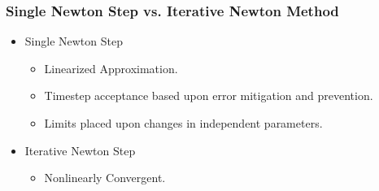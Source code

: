 \documentclass[compress,xcolor=table]{beamer}
\begin{document}
\begin{frame}
\frametitle{Single Newton Step vs. Iterative Newton Method}

\begin{itemize}
\item{Single Newton Step
\begin{itemize}
\item{Linearized Approximation.}
\item{Timestep acceptance based upon error mitigation and prevention.}
\item{Limits placed upon changes in independent parameters.}
\end{itemize}
}
\item{Iterative Newton Step
\begin{itemize}
\item{Nonlinearly Convergent.}
\end{itemize}
}
\end{itemize}

\begin{figure}[t]
\centering
\resizebox{1.0\textwidth}{!}{

}
\end{figure}

\end{frame}
\end{document}

